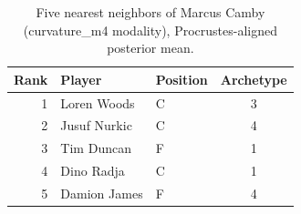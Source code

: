 \begin{table}[htbp]
  \centering\small
  \begin{tabular}{rllc}
    \toprule
    Rank & Player & Position & Archetype \\
    \midrule
    1 & Loren Woods & C & 3 \\
    2 & Jusuf Nurkic & C & 4 \\
    3 & Tim Duncan & F & 1 \\
    4 & Dino Radja & C & 1 \\
    5 & Damion James & F & 4 \\
    \bottomrule
  \end{tabular}
  \caption{Five nearest neighbors of Marcus Camby (curvature_m4 modality), Procrustes-aligned posterior mean.}
  \label{tab:Marcus_Camby_neighbors_curvature_m4}
\end{table}

